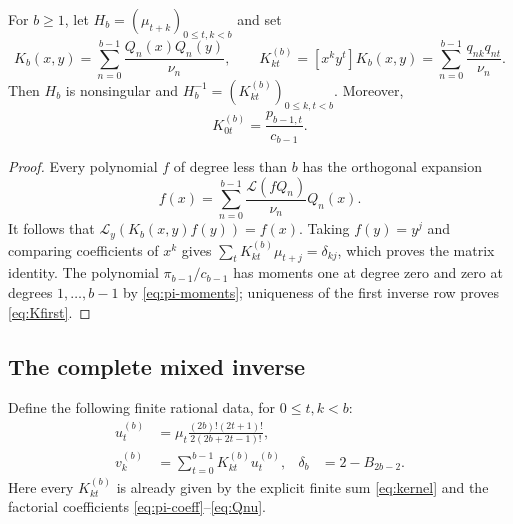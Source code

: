 \begin{theorem}
\label{thm:kernel}
For $b\geq1$, let $H_b=(\mu_{t+k})_{0\leq t,k<b}$ and set
\begin{equation}\label{eq:kernel}
 K_b(x,y)=\sum_{n=0}^{b-1}\frac{Q_n(x)Q_n(y)}{\nu_n},
 \qquad
 K_{kt}^{(b)}=[x^ky^t]K_b(x,y)
 =\sum_{n=0}^{b-1}\frac{q_{nk}q_{nt}}{\nu_n}.
\end{equation}
Then $H_b$ is nonsingular and
$H_b^{-1}=(K_{kt}^{(b)})_{0\leq k,t<b}$.
Moreover,
\begin{equation}\label{eq:Kfirst}
 K_{0t}^{(b)}=\frac{p_{b-1,t}}{c_{b-1}}.
\end{equation}
\end{theorem}
\begin{proof}
Every polynomial $f$ of degree less than $b$ has the orthogonal
expansion
\[
 f(x)=\sum_{n=0}^{b-1}
   \frac{\mathcal L(fQ_n)}{\nu_n}Q_n(x).
\]
It follows that $\mathcal L_y(K_b(x,y)f(y))=f(x)$.
Taking $f(y)=y^j$ and comparing coefficients of $x^k$ gives
$\sum_tK_{kt}^{(b)}\mu_{t+j}=\delta_{kj}$, which proves the matrix
identity. The polynomial $\pi_{b-1}/c_{b-1}$ has moments one at
degree zero and zero at degrees $1,\ldots,b-1$ by
\eqref{eq:pi-moments}; uniqueness of the first inverse row proves
\eqref{eq:Kfirst}.
\end{proof}

\subsection{The complete mixed inverse}

Define the following finite rational data, for $0\leq t,k<b$:
\begin{align}
 u_t^{(b)}&=\mu_t
   \frac{(2b)!(2t+1)!}{2(2b+2t-1)!},
 \label{eq:ut}\\
 v_k^{(b)}&=\sum_{t=0}^{b-1}K_{kt}^{(b)}u_t^{(b)},
 &\delta_b&=2-B_{2b-2}.
 \label{eq:vkdelta}
\end{align}
Here every $K_{kt}^{(b)}$ is already given by the explicit finite sum
\eqref{eq:kernel} and the factorial coefficients
\eqref{eq:pi-coeff}--\eqref{eq:Qnu}.

